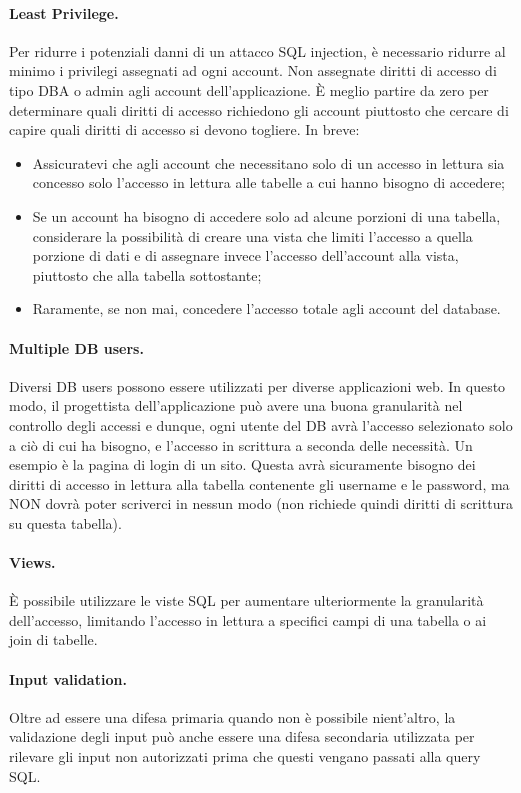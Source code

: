\paragraph{Least Privilege.}
Per ridurre i potenziali danni di un attacco SQL injection, è necessario ridurre
al minimo i
privilegi assegnati ad ogni account. Non assegnate diritti di accesso di tipo DBA
o admin agli
account dell'applicazione. È meglio partire da zero per determinare quali diritti
di accesso
richiedono gli account piuttosto che cercare di capire quali diritti di accesso
si devono togliere.
In breve:

\begin{itemize}
    \item Assicuratevi che agli account che necessitano solo di un accesso in
          lettura sia
          concesso solo l'accesso in lettura alle tabelle a cui hanno bisogno di accedere;
    \item Se un account ha bisogno di accedere solo ad alcune porzioni di una
          tabella,
          considerare la possibilità di creare una vista che limiti l'accesso a quella
          porzione di
          dati e di assegnare invece l'accesso dell'account alla vista, piuttosto che
          alla tabella sottostante;
    \item Raramente, se non mai, concedere l'accesso totale agli account del
          database.
\end{itemize}

\paragraph{Multiple DB users.}
Diversi DB users possono essere utilizzati per diverse applicazioni web.
In questo modo, il progettista dell'applicazione può avere una buona granularità
nel controllo degli accessi e dunque,
ogni utente del DB avrà l'accesso selezionato solo a ciò di cui ha bisogno, e
l'accesso in scrittura a seconda delle necessità. Un esempio è la pagina di login
di un sito. Questa avrà sicuramente bisogno dei diritti di accesso in lettura alla
tabella contenente gli username e le password, ma NON dovrà poter scriverci in
nessun modo (non richiede quindi diritti di scrittura su questa tabella).

\paragraph{Views.}
È possibile utilizzare le viste SQL per aumentare ulteriormente la granularità
dell'accesso, limitando l'accesso in lettura a specifici campi di una tabella o
ai join di tabelle.

\paragraph{Input validation.}
Oltre ad essere una difesa primaria quando non è possibile nient'altro,
la validazione degli
input può anche essere una difesa secondaria utilizzata per rilevare gli input
non autorizzati
prima che questi vengano passati alla query SQL.